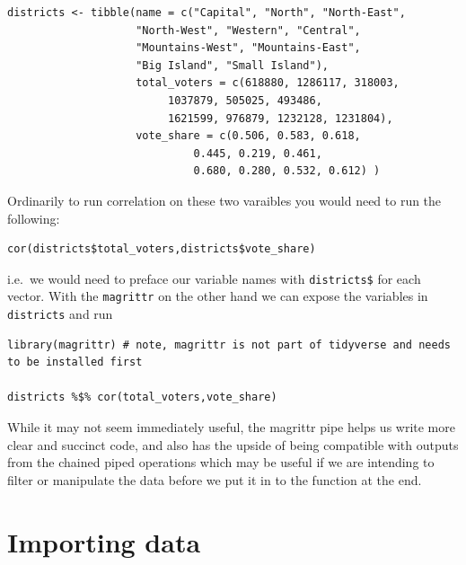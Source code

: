 \documentclass[
]{book}
\begin{document}
\begin{verbatim}
districts <- tibble(name = c("Capital", "North", "North-East",
                    "North-West", "Western", "Central",
                    "Mountains-West", "Mountains-East",
                    "Big Island", "Small Island"),
                    total_voters = c(618880, 1286117, 318003, 
                         1037879, 505025, 493486, 
                         1621599, 976879, 1232128, 1231804),
                    vote_share = c(0.506, 0.583, 0.618, 
                             0.445, 0.219, 0.461, 
                             0.680, 0.280, 0.532, 0.612) )
\end{verbatim}

Ordinarily to run correlation on these two varaibles you would need to run the following:

\begin{verbatim}
cor(districts$total_voters,districts$vote_share)
\end{verbatim}

i.e.~we would need to preface our variable names with \texttt{districts\$} for each vector. With the \texttt{magrittr} on the other hand we can expose the variables in \texttt{districts} and run

\begin{verbatim}
library(magrittr) # note, magrittr is not part of tidyverse and needs to be installed first

districts %$% cor(total_voters,vote_share)
\end{verbatim}

While it may not seem immediately useful, the magrittr pipe helps us write more clear and succinct code, and also has the upside of being compatible with outputs from the chained piped operations which may be useful if we are intending to filter or manipulate the data before we put it in to the function at the end.

\hypertarget{importing-data}{%
\chapter{Importing data}\label{importing-data}}
\end{document}
